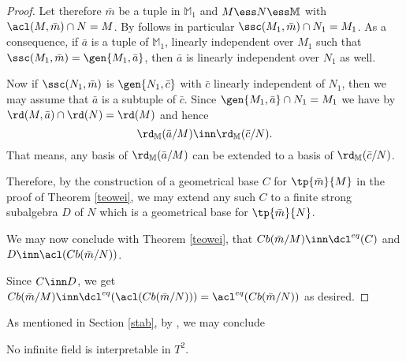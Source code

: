 \begin{proof}
\medskip
Let therefore $\bar m$ be a tuple in $\mathbb{M}_{1}$ and $M\ess N\ess\mathbb{M}$ with
$\acl(M,\bar m)\cap N=M$. 
By  follows in particular $\ssc(M_{1},\bar m)\cap N_{1}=M_{1}$.
As a consequence, if $\bar a$ is
a tuple of $\mathbb{M}_{1}$, linearly independent over $M_{1}$ such that $\ssc(M_{1},\bar m)=\gen{M_{1},\bar a}$,
then $\bar a$ is linearly independent over $N_{1}$ as well.

Now if $\ssc(N_{1},\bar m)$ is $\gen{N_{1},\bar c}$ with $\bar c$ linearly independent of $N_{1}$,
then we may assume that $\bar a$ is a subtuple of $\bar c$. Since $\gen{M_{1},\bar a}\cap N_{1}=M_{1}$ we have
by  $\rd(M,\bar a)\cap\rd(N)=\rd(M)$ and hence
$$\rd_{\mathbb{M}}(\bar a/M)\inn\rd_{\mathbb{M}}(\bar c/N).$$
That means, any basis of $\rd_{\mathbb{M}}(\bar a/M)$ can be extended to a basis of $\rd_{\mathbb{M}}(\bar c/N)$.

Therefore, by the construction of a geometrical base $C$ for $\tp{\bar m}{M}$ in the proof of Theorem \ref{teowei},
we may extend any such $C$ to a finite strong subalgebra $D$ of $N$ which is a geometrical base for $\tp{\bar m}{N}$.

%

We may now conclude with Theorem \ref{teowei}, that
$Cb(\bar m/M)\inn\dcl^{eq}(C)$ and $D\inn\acl(Cb(\bar m/N))$.

%
%
%

Since $C\inn D$, we get $Cb(\bar m/M)\inn\dcl^{eq}(\acl(Cb(\bar m/N)))=\acl^{eq}(Cb(\bar m/N))$ as desired.
\end{proof}

As mentioned in Section \ref{stab}, by \cite[Proposition 3.2]{pilcm}, we may conclude
\begin{cor}
No infinite field is interpretable in $T^{2}$.
\end{cor}
%
